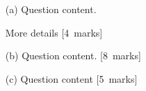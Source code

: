 %

\begin{itemize}

\item[(a)] Question content.
\vspace{-0.1cm}
\begin{center}
\end{center}
\vspace{-0.1cm} 

More details [4~marks]

\item[(b)] Question content. [8~marks]

\item[(c)] Question content [5~marks]

\end{itemize}

%
